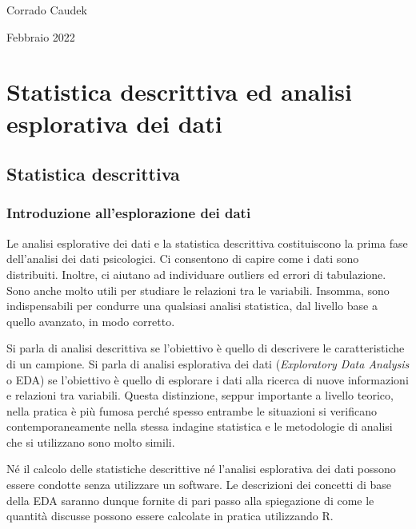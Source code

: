 \documentclass[
  11pt,
  italian,
  a4paper,
  extrafontsizes,onecolumn,openright
  ]{memoir}
\theoremstyle{definition}
\theoremstyle{definition}
\theoremstyle{definition}
\theoremstyle{definition}
\theoremstyle{remark}
\begin{document}
\bigskip

Corrado Caudek

\bigskip

Febbraio 2022

\mainmatter

\hypertarget{part-statistica-descrittiva-ed-analisi-esplorativa-dei-dati}{%
\part*{Statistica descrittiva ed analisi esplorativa dei dati}\label{part-statistica-descrittiva-ed-analisi-esplorativa-dei-dati}}

\hypertarget{descriptive-stats}{%
\chapter{Statistica descrittiva}\label{descriptive-stats}}

\hypertarget{chapter-descript}{%
\section{Introduzione all'esplorazione dei dati}\label{chapter-descript}}

Le analisi esplorative dei dati e la statistica descrittiva costituiscono la prima fase dell'analisi dei dati psicologici. Ci consentono di capire come i dati sono distribuiti. Inoltre, ci aiutano ad individuare outliers ed errori di tabulazione. Sono anche molto utili per studiare le relazioni tra le variabili. Insomma, sono indispensabili per condurre una qualsiasi analisi statistica, dal livello base a quello avanzato, in modo corretto.

Si parla di analisi descrittiva se l'obiettivo è quello di descrivere le caratteristiche di un campione. Si parla di analisi esplorativa dei dati (\emph{Exploratory Data Analysis} o EDA) se l'obiettivo è quello di esplorare i dati alla ricerca di nuove informazioni e relazioni tra variabili. Questa distinzione, seppur importante a livello teorico, nella pratica è più fumosa perché spesso entrambe le situazioni si verificano contemporaneamente nella stessa indagine statistica e le metodologie di analisi che si utilizzano sono molto simili.

Né il calcolo delle statistiche descrittive né l'analisi esplorativa dei dati possono essere condotte senza utilizzare un software. Le descrizioni dei concetti di base della EDA saranno dunque fornite di pari passo alla spiegazione di come le quantità discusse possono essere calcolate in pratica utilizzando R.
\end{document}
